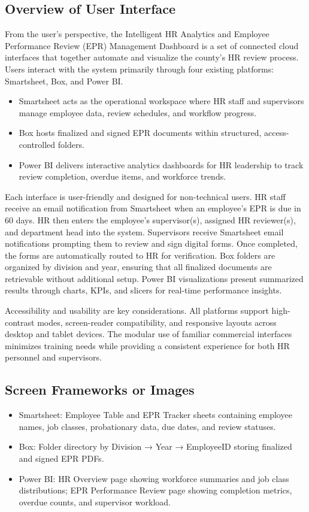 \documentclass[12pt]{article}
\def\textbf#1{#1}%
\def\&{ and }%
\begin{document}
\subsection{Overview of User Interface}
From the user’s perspective, the Intelligent HR Analytics \& Employee Performance Review (EPR) Management Dashboard is a set of connected cloud interfaces that together automate and visualize the county’s HR review process.  
Users interact with the system primarily through four existing platforms: \textbf{Smartsheet}, \textbf{Box}, and \textbf{Power BI}.

\begin{itemize}[nosep]
  \item \textbf{Smartsheet} acts as the operational workspace where HR staff and supervisors manage employee data, review schedules, and workflow progress.  
  \item \textbf{Box} hosts finalized and signed EPR documents within structured, access-controlled folders.  
  \item \textbf{Power BI} delivers interactive analytics dashboards for HR leadership to track review completion, overdue items, and workforce trends.
\end{itemize}

Each interface is user-friendly and designed for non-technical users. HR staff receive an email notification from Smartsheet when an employee’s EPR is due in 60 days. HR then enters the employee’s supervisor(s), assigned HR reviewer(s), and department head into the system. Supervisors receive Smartsheet email notifications prompting them to review and sign digital forms. Once completed, the forms are automatically routed to HR for verification.
Box folders are organized by division and year, ensuring that all finalized documents are retrievable without additional setup. Power BI visualizations present summarized results through charts, KPIs, and slicers for real-time performance insights.

Accessibility and usability are key considerations. All platforms support high-contrast modes, screen-reader compatibility, and responsive layouts across desktop and tablet devices.  
The modular use of familiar commercial interfaces minimizes training needs while providing a consistent experience for both HR personnel and supervisors.

\subsection{Screen Frameworks or Images}
\begin{itemize}[nosep]
  \item \textbf{Smartsheet:}  
        Employee Table and EPR Tracker sheets containing employee names, job classes, probationary data, due dates, and review statuses.
  \item \textbf{Box:}  
        Folder directory by Division → Year → EmployeeID storing finalized and signed EPR PDFs.
  \item \textbf{Power BI:}  
        HR Overview page showing workforce summaries and job class distributions;  
        EPR Performance Review page showing completion metrics, overdue counts, and supervisor workload.
\end{itemize}
\end{document}
